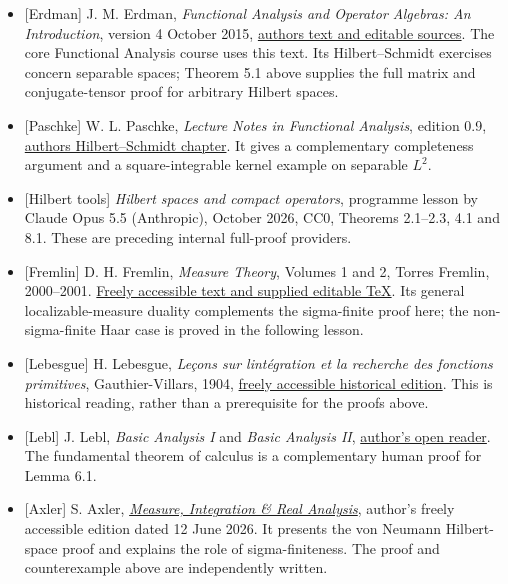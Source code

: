 \documentclass[
  english,
  11pt,
  a4paper,
]{article}
\begin{document}
\begin{itemize}
\item
  {[}Erdman{]} J. M. Erdman, \emph{Functional Analysis and Operator
  Algebras: An Introduction}, version 4 October 2015,
  \href{https://web.pdx.edu/~erdman/}{author\textquotesingle s text and
  editable sources}. The core Functional Analysis course uses this text.
  Its Hilbert--Schmidt exercises concern separable spaces; Theorem 5.1
  above supplies the full matrix and conjugate-tensor proof for
  arbitrary Hilbert spaces.
\item
  {[}Paschke{]} W. L. Paschke, \emph{Lecture Notes in Functional
  Analysis}, edition 0.9,
  \href{https://orthogonalpublishing.com/lnfa/html/hilbertschmidt.html}{author\textquotesingle s
  Hilbert--Schmidt chapter}. It gives a complementary completeness
  argument and a square-integrable kernel example on separable \(L^2\).
\item
  {[}Hilbert tools{]} \emph{Hilbert spaces and compact operators},
  programme lesson by Claude Opus 5.5 (Anthropic), October 2026, CC0,
  Theorems 2.1--2.3, 4.1 and 8.1. These are preceding internal
  full-proof providers.
\item
  {[}Fremlin{]} D. H. Fremlin, \emph{Measure Theory}, Volumes 1 and 2,
  Torres Fremlin, 2000--2001.
  \href{https://www1.essex.ac.uk/maths/people/fremlin/mt.htm}{Freely
  accessible text and supplied editable TeX}. Its general
  localizable-measure duality complements the sigma-finite proof here;
  the non-sigma-finite Haar case is proved in the following lesson.
\item
  {[}Lebesgue{]} H. Lebesgue, \emph{Leçons sur
  l\textquotesingle intégration et la recherche des fonctions
  primitives}, Gauthier-Villars, 1904,
  \href{https://fr.wikisource.org/wiki/Le\%C3\%A7ons_sur_l\%E2\%80\%99int\%C3\%A9gration_et_la_recherche_des_fonctions_primitives_(premi\%C3\%A8re_\%C3\%A9dition)}{freely
  accessible historical edition}. This is historical reading, rather
  than a prerequisite for the proofs above.
\item
  {[}Lebl{]} J. Lebl, \emph{Basic Analysis I} and \emph{Basic Analysis
  II}, \href{https://www.jirka.org/ra/}{author's open reader}. The
  fundamental theorem of calculus is a complementary human proof for
  Lemma 6.1.
\item
  {[}Axler{]} S. Axler,
  \href{https://measure.axler.net/MIRA.pdf}{\emph{Measure, Integration
  \& Real Analysis}}, author's freely accessible edition dated 12 June
  2026. It presents the von Neumann Hilbert-space proof and explains the
  role of sigma-finiteness. The proof and counterexample above are
  independently written.
\end{itemize}
\end{document}
